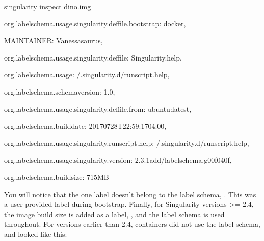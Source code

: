 \documentclass[letterpaper,10pt,english]{sphinxmanual}
\begin{document}
%
\begin{sphinxVerbatim}[commandchars=\\\{\}]
\PYGZdl{} singularity inspect dino.img

\PYGZob{}

    \PYGZdq{}org.label\PYGZhy{}schema.usage.singularity.deffile.bootstrap\PYGZdq{}: \PYGZdq{}docker\PYGZdq{},

    \PYGZdq{}MAINTAINER\PYGZdq{}: \PYGZdq{}Vanessasaurus\PYGZdq{},

    \PYGZdq{}org.label\PYGZhy{}schema.usage.singularity.deffile\PYGZdq{}: \PYGZdq{}Singularity.help\PYGZdq{},

    \PYGZdq{}org.label\PYGZhy{}schema.usage\PYGZdq{}: \PYGZdq{}/.singularity.d/runscript.help\PYGZdq{},

    \PYGZdq{}org.label\PYGZhy{}schema.schema\PYGZhy{}version\PYGZdq{}: \PYGZdq{}1.0\PYGZdq{},

    \PYGZdq{}org.label\PYGZhy{}schema.usage.singularity.deffile.from\PYGZdq{}: \PYGZdq{}ubuntu:latest\PYGZdq{},

    \PYGZdq{}org.label\PYGZhy{}schema.build\PYGZhy{}date\PYGZdq{}: \PYGZdq{}2017\PYGZhy{}07\PYGZhy{}28T22:59:17\PYGZhy{}04:00\PYGZdq{},

    \PYGZdq{}org.label\PYGZhy{}schema.usage.singularity.runscript.help\PYGZdq{}: \PYGZdq{}/.singularity.d/runscript.help\PYGZdq{},

    \PYGZdq{}org.label\PYGZhy{}schema.usage.singularity.version\PYGZdq{}: \PYGZdq{}2.3.1\PYGZhy{}add/label\PYGZhy{}schema.g00f040f\PYGZdq{},

    \PYGZdq{}org.label\PYGZhy{}schema.build\PYGZhy{}size\PYGZdq{}: \PYGZdq{}715MB\PYGZdq{}

\PYGZcb{}
\end{sphinxVerbatim}

You will notice that the one label doesn’t belong to the label schema,  .
This was a user provided label during bootstrap. Finally, for
Singularity versions \textgreater{}= 2.4, the image build size is added as a label, ,
and the label schema is used throughout. For versions earlier than 2.4,
containers did not use the label schema, and looked like this:
\end{document}
